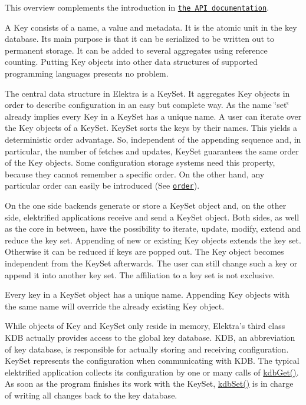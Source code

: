 This overview complements the introduction in \href{https://doc.libelektra.org/api/current/html/}{\tt the A\+PI documentation}.

A {\ttfamily Key} consists of a name, a value and metadata. It is the atomic unit in the key database. Its main purpose is that it can be serialized to be written out to permanent storage. It can be added to several aggregates using reference counting. Putting {\ttfamily Key} objects into other data structures of supported programming languages presents no problem.

The central data structure in Elektra is a {\ttfamily Key\+Set}. It aggregates {\ttfamily Key} objects in order to describe configuration in an easy but complete way. As the name \char`\"{}set\char`\"{} already implies every {\ttfamily Key} in a {\ttfamily Key\+Set} has a unique name. A user can iterate over the {\ttfamily Key} objects of a {\ttfamily Key\+Set}. {\ttfamily Key\+Set} sorts the keys by their names. This yields a deterministic order advantage. So, independent of the appending sequence and, in particular, the number of fetches and updates, {\ttfamily Key\+Set} guarantees the same order of the {\ttfamily Key} objects. Some configuration storage systems need this property, because they cannot remember a specific order. On the other hand, any particular order can easily be introduced (See \href{/home/jenkins/workspace/libelektra-release/doc/METADATA.ini}{\tt order}).

On the one side backends generate or store a {\ttfamily Key\+Set} object and, on the other side, elektrified applications receive and send a {\ttfamily Key\+Set} object. Both sides, as well as the core in between, have the possibility to iterate, update, modify, extend and reduce the key set. Appending of new or existing {\ttfamily Key} objects extends the key set. Otherwise it can be reduced if keys are popped out. The {\ttfamily Key} object becomes independent from the {\ttfamily Key\+Set} afterwards. The user can still change such a key or append it into another key set. The affiliation to a key set is not exclusive.

Every key in a {\ttfamily Key\+Set} object has a unique name. Appending {\ttfamily Key} objects with the same name will override the already existing {\ttfamily Key} object.

While objects of {\ttfamily Key} and {\ttfamily Key\+Set} only reside in memory, Elektra’s third class {\ttfamily K\+DB} actually provides access to the global key database. {\ttfamily K\+DB}, an abbreviation of key database, is responsible for actually storing and receiving configuration. {\ttfamily Key\+Set} represents the configuration when communicating with {\ttfamily K\+DB}. The typical elektrified application collects its configuration by one or many calls of {\ttfamily \hyperlink{group__kdb_ga28e385fd9cb7ccfe0b2f1ed2f62453a1}{kdb\+Get()}}. As soon as the program finishes its work with the {\ttfamily Key\+Set}, {\ttfamily \hyperlink{group__kdb_ga11436b058408f83d303ca5e996832bcf}{kdb\+Set()}} is in charge of writing all changes back to the key database.

